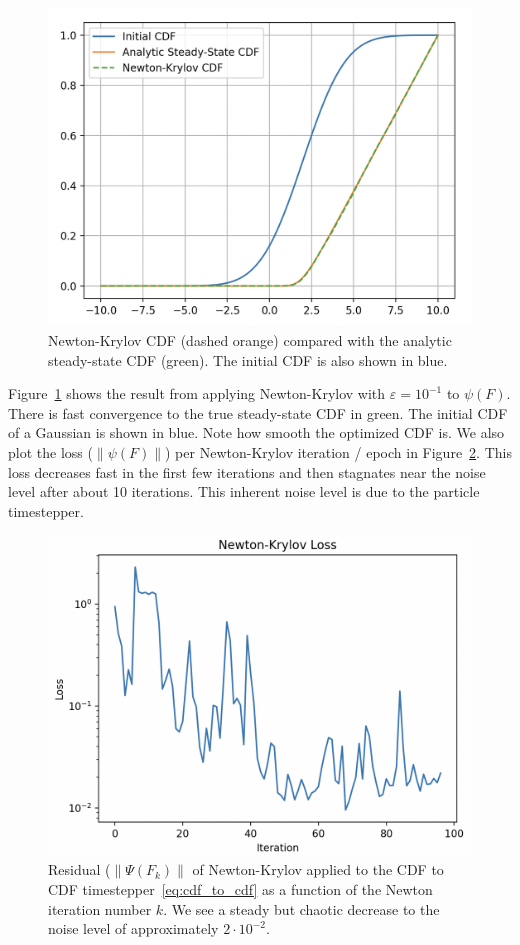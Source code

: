 \documentclass{article}
\newcommand{\norm}[1]{\left\lVert #1 \right\rVert}
\begin{document}
\begin{figure}[ht]
    \centering
    \includegraphics[width=0.7\linewidth]{figures/Simple Chemotaxis CDF.png}
    \caption{Newton-Krylov CDF (dashed orange) compared with the analytic steady-state CDF (green). The initial CDF is also shown in blue.}
    \label{fig:cdf_convergence}
\end{figure}

Figure~\ref{fig:cdf_convergence} shows the result from applying Newton-Krylov with $\varepsilon = 10^{-1}$ to $\psi(F)$. There is fast convergence to the true steady-state CDF in green. The initial CDF of a Gaussian is shown in blue. Note how smooth the optimized CDF is. We also plot the loss ($\norm{\psi(F)}$) per Newton-Krylov iteration / epoch in Figure~\ref{fig:cdf_losses}. This loss decreases fast in the first few iterations and then stagnates near the noise level after about 10 iterations. This inherent noise level is due to the particle timestepper.

\begin{figure}[ht]
    \centering
    \includegraphics[width=0.7\linewidth]{figures/CDF to CDF NK Losses.png}
    \caption{Residual ($\norm{\Psi(F_k)}$ of Newton-Krylov applied to the CDF to CDF timestepper~\eqref{eq:cdf_to_cdf} as a function of the Newton iteration number $k$. We see a steady but chaotic decrease to the noise level of approximately $2 \cdot 10^{-2}$.}
    \label{fig:cdf_losses}
\end{figure}
\end{document}
